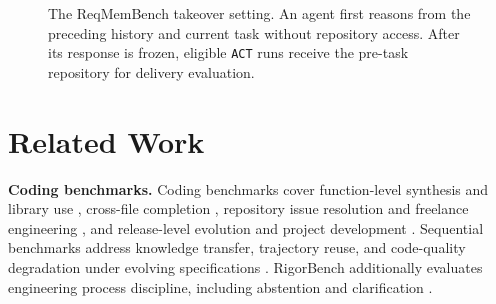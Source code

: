 \documentclass{article} %
\newcommand{\placeholder}[1]{\emph{[#1]}}
\begin{document}
\begin{figure}[b]
\begin{center}
\end{center}
\caption{The ReqMemBench takeover setting. An agent first reasons from the preceding history and current task without repository access. After its response is frozen, eligible \texttt{ACT} runs receive the pre-task repository for delivery evaluation.}
\label{fig:motivation}
\end{figure}


\section{Related Work}
\label{sec:related-work}

\noindent\textbf{Coding benchmarks.}
Coding benchmarks cover function-level synthesis and library use
\citep{chen2021codex,austin2021mbpp,zhuo2025bigcodebench},
cross-file completion \citep{ding2023crosscodeeval,liu2024repobench},
repository issue resolution and freelance engineering
\citep{jimenez2024swebench,miserendino2025swelancer}, and
release-level evolution and project development
\citep{le2026sweevo,lu2026projdevbench}.
Sequential benchmarks address knowledge transfer, trajectory reuse,
and code-quality degradation under evolving specifications
\citep{joshi2025swebenchcl,zhu2026swecontextbench,orlanski2026slopcode}.
RigorBench additionally evaluates engineering process discipline,
including abstention and clarification \citep{madiraju2026rigorbench}.
\end{document}
